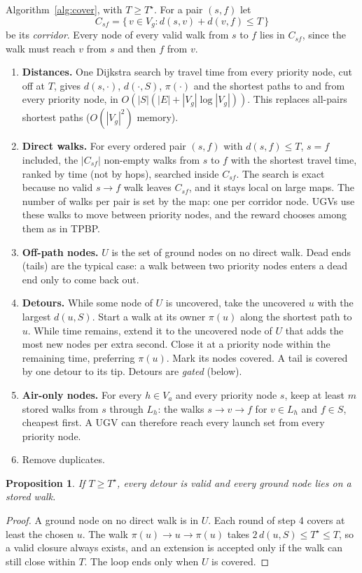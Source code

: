 \documentclass[11pt]{article}
\theoremstyle{definition}
\theoremstyle{plain}
\newtheorem{proposition}{Proposition}
\begin{document}
Algorithm~\ref{alg:cover}, with $T \geq T^\star$. For a pair $(s, f)$ let
\begin{equation}
C_{sf} = \{\, v \in V_g : d(s, v) + d(v, f) \leq T \,\}
\end{equation}
be its \emph{corridor}. Every node of every valid walk from $s$ to $f$ lies
in $C_{sf}$, since the walk must reach $v$ from $s$ and then $f$ from $v$.
\begin{enumerate}
\item \textbf{Distances.} One Dijkstra search by travel time from every
priority node, cut off at $T$, gives $d(s, \cdot)$, $d(\cdot, S)$, $\pi(\cdot)$
and the shortest paths to and from every priority node, in $O(|S|(|E| +
|V_g| \log |V_g|))$. This replaces all-pairs shortest paths ($O(|V_g|^2)$
memory).
\item \textbf{Direct walks.} For every ordered pair $(s, f)$ with $d(s, f)
\leq T$, $s = f$ included, the $|C_{sf}|$ non-empty walks from $s$ to $f$ with
the shortest travel time, ranked by time (not by hops), searched inside
$C_{sf}$. The search is exact because no valid $s \to f$ walk leaves
$C_{sf}$, and it stays local on large maps. The number of walks per pair is
set by the map: one per corridor node. UGVs use these walks to move between
priority nodes, and the reward chooses among them as in TPBP.
\item \textbf{Off-path nodes.} $U$ is the set of ground nodes on no direct
walk. Dead ends (tails) are the typical case: a walk between two priority
nodes enters a dead end only to come back out.
\item \textbf{Detours.} While some node of $U$ is uncovered, take the
uncovered $u$ with the largest $d(u, S)$. Start a walk at its owner
$\pi(u)$ along the shortest path to $u$. While time remains, extend it to
the uncovered node of $U$ that adds the most new nodes per extra second.
Close it at a priority node within the remaining time, preferring
$\pi(u)$. Mark its nodes covered. A tail is covered by one detour to its
tip. Detours are \emph{gated} (below).
\item \textbf{Air-only nodes.} For every $h \in V_a$ and every priority node
$s$, keep at least $m$ stored walks from $s$ through $L_h$: the walks
$s \to v \to f$ for $v \in L_h$ and $f \in S$, cheapest first. A UGV can
therefore reach every launch set from every priority node.
\item Remove duplicates.
\end{enumerate}

\begin{proposition}
\label{prop:covset}
If $T \geq T^\star$, every detour is valid and every ground node lies on a
stored walk.
\end{proposition}
\begin{proof}
A ground node on no direct walk is in $U$. Each round of step 4 covers at
least the chosen $u$. The walk $\pi(u) \to u \to \pi(u)$ takes $2\, d(u,
S) \leq T^\star \leq T$, so a valid closure always exists, and an extension
is accepted only if the walk can still close within $T$. The loop ends
only when $U$ is covered.
\end{proof}
\end{document}
